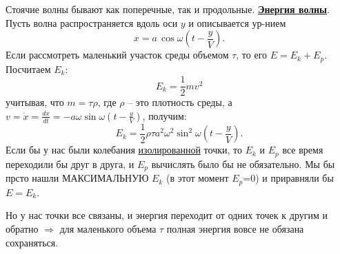 \documentclass[12pt,epsfig,color,russian]{article}
\begin{document}
Стоячие волны бывают как поперечные, так и продольные.
\newpage
\underline{\bf Энергия волны}.\\
Пусть волна распространяется вдоль оси $y$ и описывается ур-нием
\begin{displaymath}
x=a\,\cos \omega\left(t-\frac yV\right).
\end{displaymath}
Если рассмотреть маленький участок среды объемом $\tau$, то его $E=E_k+E_p$. Посчитаем $E_k$:
\begin{displaymath}
E_k=\frac12mv^2
\end{displaymath}
учитывая, что $m=\tau\rho$, где $\rho$ -- это плотность среды, а $v=\dot{x}=\frac{dx}{dt}=-a\omega\sin \omega\left(t-\frac yV\right)$, получим:
\begin{displaymath}
E_k=\frac12\rho\tau a^2\omega^2 \sin^2 \omega\left(t-\frac yV\right).
\end{displaymath}
Если бы у нас были колебания \underline{изолированной} точки, то $E_k$ и $E_p$ все время переходили бы друг в друга, и $E_p$ вычислять было бы не обязательно. Мы бы прсто нашли МАКСИМАЛЬНУЮ $E_k$ (в этот момент $E_p$=0) и приравняли бы $E=E_k$.

Но у нас точки все связаны, и энергия переходит от одних точек к другим и обратно $\Rightarrow$ для маленького объема $\tau$ полная энергия вовсе не обязана сохраняться.
\end{document}
